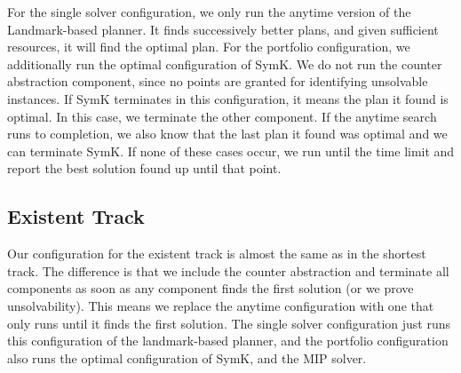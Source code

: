 \documentclass{article}
\renewcommand{\todo}[1]{} %
\begin{document}
For the single solver configuration, we only run the anytime version of the Landmark-based planner. It finds successively better plans, and given sufficient resources, it will find the optimal plan. For the portfolio configuration, we additionally run the optimal configuration of SymK. We do not run the counter abstraction component, since no points are granted for identifying unsolvable instances. If SymK terminates in this configuration, it means the plan it found is optimal. In this case, we terminate the other component. If the anytime search runs to completion, we also know that the last plan it found was optimal and we can terminate SymK. If none of these cases occur, we run until the time limit and report the best solution found up until that point.

\todo{\begin{itemize}
    \item For the single solver configuration, we only run the anytime version of the Landmark-based planner. It finds successively better plans, and given sufficient resources, it will find the optimal plan.
    \item For the portfolio configuration, we additionally run the optimal configuration of SymK, and the counter abstraction component.
    \item If the counter abstractions show that the instance is unsolvable, we terminate the other components.
    \item If SymK terminates in this configuration, it means the plan it found is optimal. in this case, we also terminate the other components.
    \item If the anytime search runs to completion, we also know that the last plan it found was optimal and we can terminate the other components.
    \item If none of these cases occur, we run until the time limit and report the best solution found until then.
\end{itemize}}


\subsection{Existent Track}

Our configuration for the existent track is almost the same as in the shortest track. The difference is that we include the counter abstraction and terminate all components as soon as any component finds the first solution (or we prove unsolvability). This means we replace the anytime configuration with one that only runs until it finds the first solution. The single solver configuration just runs this configuration of the landmark-based planner, and the portfolio configuration also runs the optimal configuration of SymK, and the MIP solver.
\end{document}

